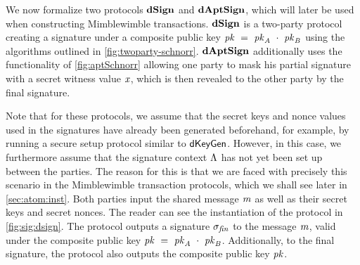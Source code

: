 We now formalize two protocols $\mathbf{dSign}$ and $\mathbf{dAptSign}$, which will later be used when constructing Mimblewimble transactions.
$\mathbf{dSign}$ is a two-party protocol creating a signature under a composite public key $\mathit{pk} ~=~ \mathit{pk}_{\mathit{A}} ~\cdot~ \mathit{pk}_{\mathit{B}}$ using the algorithms outlined in \cref{fig:twoparty-schnorr}.
$\mathbf{dAptSign}$ additionally uses the functionality of \cref{fig:aptSchnorr} allowing one party to mask his partial signature with a secret witness value $\mathit{x}$, which is then revealed to the other party by the final signature.

Note that for these protocols, we assume that the secret keys and nonce values used in the signatures have already been generated beforehand, for example, by running a secure setup protocol similar to $\mathsf{dKeyGen}$.
However, in this case, we furthermore assume that the signature context $\Lambda$ has not yet been set up between the parties.
The reason for this is that we are faced with precisely this scenario in the Mimblewimble transaction protocols, which we shall see later in \cref{sec:atom:inst}.
Both parties input the shared message $\mathit{m}$ as well as their secret keys and secret nonces.
The reader can see the instantiation of the protocol in \cref{fig:sig:dsign}.
The protocol outputs a signature $\sigma_{\mathit{fin}}$ to the message $\mathit{m}$, valid under the composite public key $\mathit{pk} ~=~ \mathit{pk}_{\mathit{A}} ~\cdot~ \mathit{pk}_{\mathit{B}}$.
Additionally, to the final signature, the protocol also outputs the composite public key $\mathit{pk}$.


